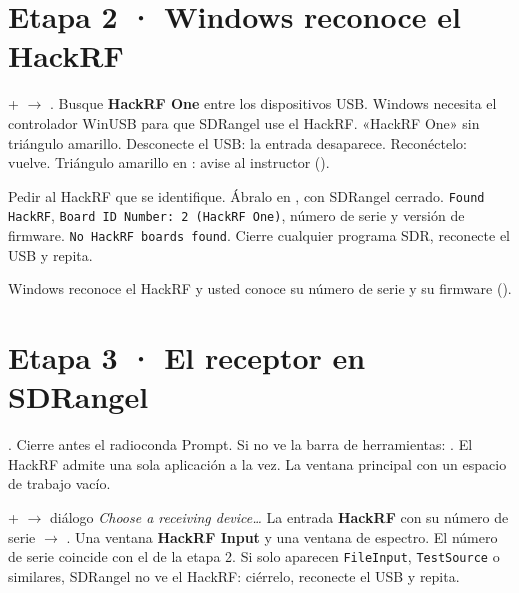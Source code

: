 \section{Etapa 2 · Windows reconoce el HackRF}
\label{sec:w-windows}


{+ $\rightarrow$ .}
{Busque \textbf{HackRF One} entre los dispositivos USB.}
{Windows necesita el controlador WinUSB para que SDRangel use el HackRF.}
{«HackRF One» sin triángulo amarillo.}
{Desconecte el USB: la entrada desaparece. Reconéctelo: vuelve.}
{Triángulo amarillo en : avise al instructor ().}

{Pedir al HackRF que se identifique. Ábralo en , con SDRangel cerrado.}
{\texttt{Found HackRF}, \texttt{Board ID Number: 2 (HackRF One)}, número de serie y versión de firmware.}
{\texttt{No HackRF boards found}.}
{Cierre cualquier programa SDR, reconecte el USB y repita.}

\begin{logro}
Windows reconoce el HackRF y usted conoce su número de serie y su firmware ().
\end{logro}

\section{Etapa 3 · El receptor en SDRangel}
\label{sec:w-sdrangel}


{. Cierre antes el radioconda Prompt.}
{Si no ve la barra de herramientas: .}
{El HackRF admite una sola aplicación a la vez.}
{La ventana principal con un espacio de trabajo vacío.}
{}
{}

{+ $\rightarrow$ diálogo \emph{Choose a receiving device\ldots}}
{La entrada \textbf{HackRF} con su número de serie $\rightarrow$ .}
{}
{Una ventana \textbf{HackRF Input} y una ventana de espectro.}
{El número de serie coincide con el de la etapa 2.}
{Si solo aparecen \texttt{FileInput}, \texttt{TestSource} o similares, SDRangel no ve el HackRF: ciérrelo, reconecte el USB y repita.}
\label{paso:w-seldisp}

